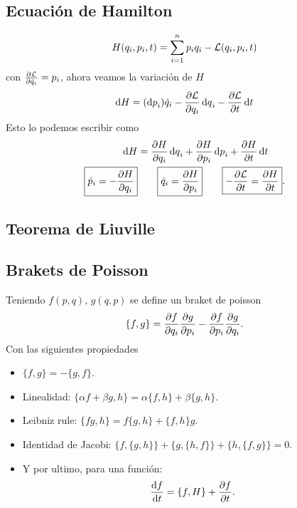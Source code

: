 \subsection{Ecuación de Hamilton}
\begin{equation}
	H(q_i, p_i, t) = \sum _{i=1} ^n p_i q_i - \mathcal{L} (q_i,p_i,t)
\end{equation}
con $\pdv{\mathcal{L}}{\dot{q}_i} = p_i$, ahora veamos la variación de $H$
\begin{equation}
	\dd{H} = (\dd{p}_i) \dot{q}_i - \pdv{\mathcal{L}}{q_i} \dd{q}_i - \pdv{\mathcal{L}}{t} \dd{t}
\end{equation}
Esto lo podemos escribir como
\begin{align}
	\dd{H} &= \pdv{H}{q_i} \dd{q}_i + \pdv{H}{p_i} \dd{p}_i + \pdv{H}{t} \dd{t} \\
	\boxed{\dot{p}_i = -\pdv{H}{q_i}} &\qquad \boxed{\dot{q}_i = \pdv{H}{p_i}} \qquad \boxed{-\pdv{\mathcal{L}}{t} = \pdv{H}{t}}.
\end{align}




\subsection{Teorema de Liuville}







\subsection{Brakets de Poisson}
Teniendo $f(p,q)$, $g(q,p)$ se define un braket de poisson
\begin{equation}
	\{ f,g \} = \pdv{f}{q_i} \pdv{g}{p_i} - \pdv{f}{p_i} \pdv{g}{q_i}.
\end{equation}
Con las siguientes propiedades
\begin{itemize}
	\item $\{ f,g \} = -\{ g,f \}$.
	\item Linealidad: $ \{ \alpha f + \beta g, h \} = \alpha \{ f,h \} + \beta \{ g,h \} $.
	\item Leibniz rule: $\{ fg,h \} = f\{ g,h \} + \{ f,h \} g$.
	\item Identidad de Jacobi: $\{ f,\{ g,h\} \} + \{ g,\{ h,f\} \} + \{ h,\{ f,g\} \} = 0$.
	\item Y por ultimo, para una función:
		\begin{equation}
			\dv{f}{t} = \{ f,H \} + \pdv{f}{t}.
		\end{equation}
\end{itemize}





